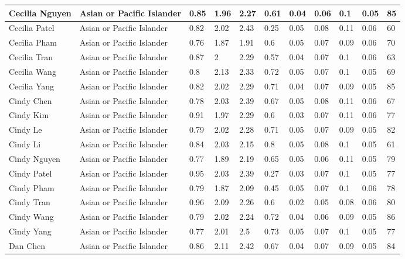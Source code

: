 \begin{table}[!ht]
\begin{tabular}{|l|l|l|l|l|l|l|l|l|l|l|}
        Cecilia Nguyen & Asian or Pacific Islander & 0.85 & 1.96 & 2.27 & 0.61 & 0.04 & 0.06 & 0.1 & 0.05 & 85 \\ \hline
        Cecilia Patel & Asian or Pacific Islander & 0.82 & 2.02 & 2.43 & 0.25 & 0.05 & 0.08 & 0.11 & 0.06 & 60 \\ \hline
        Cecilia Pham & Asian or Pacific Islander & 0.76 & 1.87 & 1.91 & 0.6 & 0.05 & 0.07 & 0.09 & 0.06 & 70 \\ \hline
        Cecilia Tran & Asian or Pacific Islander & 0.87 & 2 & 2.29 & 0.57 & 0.04 & 0.07 & 0.1 & 0.06 & 63 \\ \hline
        Cecilia Wang & Asian or Pacific Islander & 0.8 & 2.13 & 2.33 & 0.72 & 0.05 & 0.07 & 0.1 & 0.05 & 69 \\ \hline
        Cecilia Yang & Asian or Pacific Islander & 0.82 & 2.02 & 2.29 & 0.71 & 0.04 & 0.07 & 0.09 & 0.05 & 85 \\ \hline
        Cindy Chen & Asian or Pacific Islander & 0.78 & 2.03 & 2.39 & 0.67 & 0.05 & 0.08 & 0.11 & 0.06 & 67 \\ \hline
        Cindy Kim & Asian or Pacific Islander & 0.91 & 1.97 & 2.29 & 0.6 & 0.03 & 0.07 & 0.11 & 0.06 & 77 \\ \hline
        Cindy Le & Asian or Pacific Islander & 0.79 & 2.02 & 2.28 & 0.71 & 0.05 & 0.07 & 0.09 & 0.05 & 82 \\ \hline
        Cindy Li & Asian or Pacific Islander & 0.84 & 2.03 & 2.15 & 0.8 & 0.05 & 0.08 & 0.1 & 0.05 & 61 \\ \hline
        Cindy Nguyen & Asian or Pacific Islander & 0.77 & 1.89 & 2.19 & 0.65 & 0.05 & 0.06 & 0.11 & 0.05 & 79 \\ \hline
        Cindy Patel & Asian or Pacific Islander & 0.95 & 2.03 & 2.39 & 0.27 & 0.03 & 0.07 & 0.1 & 0.05 & 77 \\ \hline
        Cindy Pham & Asian or Pacific Islander & 0.79 & 1.87 & 2.09 & 0.45 & 0.05 & 0.07 & 0.1 & 0.06 & 78 \\ \hline
        Cindy Tran & Asian or Pacific Islander & 0.96 & 2.09 & 2.26 & 0.6 & 0.02 & 0.05 & 0.08 & 0.06 & 80 \\ \hline
        Cindy Wang & Asian or Pacific Islander & 0.79 & 2.02 & 2.24 & 0.72 & 0.04 & 0.06 & 0.09 & 0.05 & 86 \\ \hline
        Cindy Yang & Asian or Pacific Islander & 0.77 & 2.01 & 2.5 & 0.73 & 0.05 & 0.07 & 0.1 & 0.05 & 77 \\ \hline
        Dan Chen & Asian or Pacific Islander & 0.86 & 2.11 & 2.42 & 0.67 & 0.04 & 0.07 & 0.09 & 0.05 & 84 \\ \hline

\end{tabular}
\end{table}
